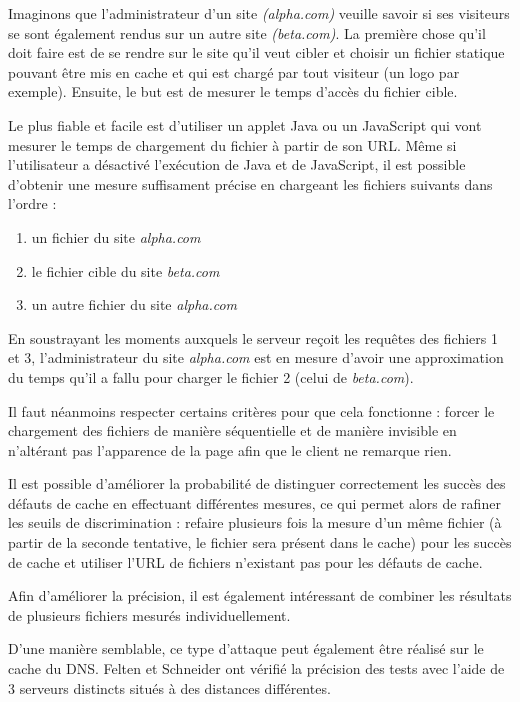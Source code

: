 Imaginons que l'administrateur d'un site \emph{(alpha.com)} veuille savoir si ses visiteurs se sont également rendus sur un autre site \emph{(beta.com)}. La première chose qu'il doit faire est de se rendre sur le site qu'il veut cibler et choisir un fichier statique pouvant être mis en cache et qui est chargé par tout visiteur (un logo par exemple). Ensuite, le but est de mesurer le temps d'accès du fichier cible.

Le plus fiable et facile est d'utiliser un applet Java ou un JavaScript qui vont mesurer le temps de chargement du fichier à partir de son URL. Même si l'utilisateur a désactivé l'exécution de Java et de JavaScript, il est possible d'obtenir une mesure suffisament précise en chargeant les fichiers suivants dans l'ordre :

\begin{enumerate}
  \item un fichier du site \emph{alpha.com}
  \item le fichier cible du site \emph{beta.com}
  \item un autre fichier du site \emph{alpha.com}
\end{enumerate}

En soustrayant les moments auxquels le serveur reçoit les requêtes des fichiers 1 et 3, l'administrateur du site \emph{alpha.com} est en mesure d'avoir une approximation du temps qu'il a fallu pour charger le fichier 2 (celui de \emph{beta.com}).

Il faut néanmoins respecter certains critères pour que cela fonctionne : forcer le chargement des fichiers de manière séquentielle et de manière invisible en n'altérant pas l'apparence de la page afin que le client ne remarque rien.
\newline

Il est possible d'améliorer la probabilité de distinguer correctement les succès des défauts de cache en effectuant différentes mesures, ce qui permet alors de rafiner les seuils de discrimination : refaire plusieurs fois la mesure d'un même fichier (à partir de la seconde tentative, le fichier sera présent dans le cache) pour les succès de cache et utiliser l'URL de fichiers n'existant pas pour les défauts de cache.

Afin d'améliorer la précision, il est également intéressant de combiner les résultats de plusieurs fichiers mesurés individuellement.
\newline

D'une manière semblable, ce type d'attaque peut également être réalisé sur le cache du DNS. Felten et Schneider ont vérifié la précision des tests avec l'aide de 3 serveurs distincts situés à des distances différentes.

